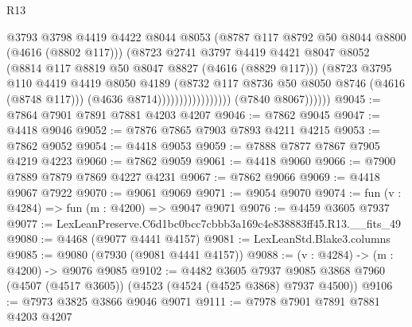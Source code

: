\begin{lexlean}{R13}
\begin{coremodule}
                                          @3793
                                          @3798
                                          @4419
                                          @4422
                                          @8044
                                          @8053
                                          (@8787 @117 @8792 @50 @8044 @8800 (@4616 (@8802 @117)))
                                          (@8723
                                            @2741
                                            @3797
                                            @4419
                                            @4421
                                            @8047
                                            @8052
                                            (@8814 @117 @8819 @50 @8047 @8827 (@4616 (@8829 @117)))
                                            (@8723
                                              @3795
                                              @110
                                              @4419
                                              @4419
                                              @8050
                                              @4189
                                              (@8732
                                                @117
                                                @8736
                                                @50
                                                @8050
                                                @8746
                                                (@4616 (@8748 @117)))
                                              (@4636 @8714)))))))))))))))))
              (@7840 @8067))))))
@9045 := @7864 @7901 @7891 @7881 @4203 @4207
@9046 := @7862 @9045
@9047 := @4418 @9046
@9052 := @7876 @7865 @7903 @7893 @4211 @4215
@9053 := @7862 @9052
@9054 := @4418 @9053
@9059 := @7888 @7877 @7867 @7905 @4219 @4223
@9060 := @7862 @9059
@9061 := @4418 @9060
@9066 := @7900 @7889 @7879 @7869 @4227 @4231
@9067 := @7862 @9066
@9069 := @4418 @9067 @7922
@9070 := @9061 @9069
@9071 := @9054 @9070
@9074 := fun (v : @4284) => fun (m : @4200) => @9047 @9071
@9076 := @4459 @3605 @7937
@9077 := LexLeanPreserve.C6d1bc0bcc7cbbb3a169c4e838883ff45.R13.__fits_49
@9080 := @4468 (@9077 @4441 @4157)
@9081 := LexLeanStd.Blake3.columns
@9085 := @9080 (@7930 (@9081 @4441 @4157))
@9088 := (v : @4284) -> (m : @4200) -> @9076 @9085
@9102 := @4482
    @3605
    @7937
    @9085
    @3868
    @7960
    (@4507 (@4517 @3605))
    (@4523 (@4524 (@4525 @3868) @7937 @4500))
@9106 := @7973 @3825 @3866 @9046 @9071
@9111 := @7978 @7901 @7891 @7881 @4203 @4207

\end{coremodule}
\end{lexlean}
